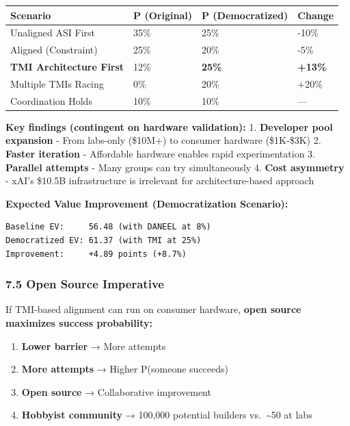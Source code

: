 \documentclass[
  11pt,
]{article}
\newcounter{none} %
\providecommand{\tightlist}{%
  \setlength{\itemsep}{0pt}\setlength{\parskip}{0pt}}
\begin{document}
{\def\LTcaptype{none} %
\begin{longtable}[]{@{}llll@{}}
\toprule\noalign{}
Scenario & P (Original) & P (Democratized) & Change \\
\midrule\noalign{}
\endhead
\bottomrule\noalign{}
\endlastfoot
Unaligned ASI First & 35\% & 25\% & -10\% \\
Aligned (Constraint) & 25\% & 20\% & -5\% \\
\textbf{TMI Architecture First} & 12\% & \textbf{25\%} &
\textbf{+13\%} \\
Multiple TMIs Racing & 0\% & 20\% & +20\% \\
Coordination Holds & 10\% & 10\% & --- \\
\end{longtable}
}

\textbf{Key findings (contingent on hardware validation):} 1.
\textbf{Developer pool expansion} - From labs-only (\$10M+) to consumer
hardware (\$1K-\$3K) 2. \textbf{Faster iteration} - Affordable hardware
enables rapid experimentation 3. \textbf{Parallel attempts} - Many
groups can try simultaneously 4. \textbf{Cost asymmetry} - xAI's \$10.5B
infrastructure is irrelevant for architecture-based approach

\textbf{Expected Value Improvement (Democratization Scenario):}

\begin{verbatim}
Baseline EV:     56.48 (with DANEEL at 8%)
Democratized EV: 61.37 (with TMI at 25%)
Improvement:     +4.89 points (+8.7%)
\end{verbatim}

\subsubsection{7.5 Open Source Imperative}\label{open-source-imperative}

If TMI-based alignment can run on consumer hardware, \textbf{open source
maximizes success probability:}

\begin{enumerate}
\def\labelenumi{\arabic{enumi}.}
\tightlist
\item
  \textbf{Lower barrier} → More attempts
\item
  \textbf{More attempts} → Higher P(someone succeeds)
\item
  \textbf{Open source} → Collaborative improvement
\item
  \textbf{Hobbyist community} → 100,000 potential builders
  vs.~\textasciitilde50 at labs
\end{enumerate}
\end{document}
